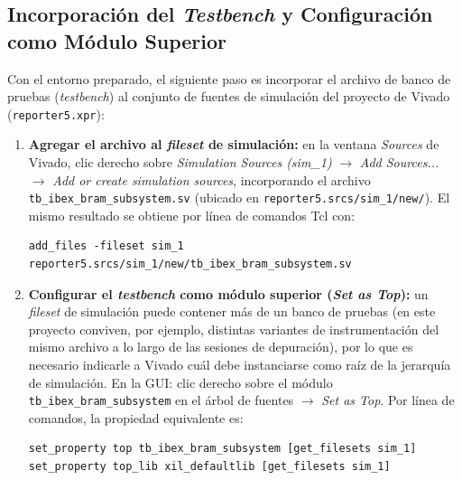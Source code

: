 
\subsection{Incorporación del \textit{Testbench} y Configuración como Módulo Superior}
\label{ssec:tb_como_top}

Con el entorno preparado, el siguiente paso es incorporar el archivo de
banco de pruebas (\textit{testbench}) al conjunto de fuentes de
simulación del proyecto de Vivado (\texttt{reporter5.xpr}):

\begin{enumerate}
    \item \textbf{Agregar el archivo al \textit{fileset} de simulación:}
    en la ventana \textit{Sources} de Vivado, clic derecho sobre
    \textit{Simulation Sources (sim\_1)} $\rightarrow$ \textit{Add
    Sources...} $\rightarrow$ \textit{Add or create simulation sources},
    incorporando el archivo \texttt{tb\_ibex\_bram\_subsystem.sv}
    (ubicado en \texttt{reporter5.srcs/sim\_1/new/}). El mismo resultado
    se obtiene por línea de comandos Tcl con:
    
\begin{lstlisting}[style=bashstyle]
add_files -fileset sim_1 reporter5.srcs/sim_1/new/tb_ibex_bram_subsystem.sv
\end{lstlisting}

    \item \textbf{Configurar el \textit{testbench} como módulo superior
    (\textit{Set as Top}):} un \textit{fileset} de simulación puede
    contener más de un banco de pruebas (en este proyecto conviven, por
    ejemplo, distintas variantes de instrumentación del mismo archivo a lo
    largo de las sesiones de depuración), por lo que es necesario indicarle
    a Vivado cuál debe instanciarse como raíz de la jerarquía de
    simulación. En la GUI: clic derecho sobre el módulo
    \texttt{tb\_ibex\_bram\_subsystem} en el árbol de fuentes
    $\rightarrow$ \textit{Set as Top}. Por línea de comandos, la propiedad
    equivalente es:

\begin{lstlisting}[style=bashstyle]
set_property top tb_ibex_bram_subsystem [get_filesets sim_1]
set_property top_lib xil_defaultlib [get_filesets sim_1]
\end{lstlisting}


\end{enumerate}
